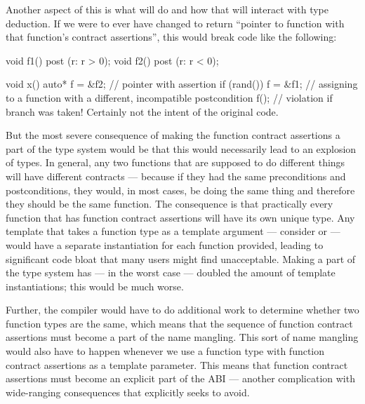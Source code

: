 Another aspect of this is what  will do and how that will interact with type deduction. If we were to ever have  changed to return ``pointer to function with that function's contract assertions'', this would break code like the following:
\begin{codeblock}
void f1() post (r: r > 0);
void f2() post (r: r < 0);

void x() {
  auto* f = &f2;   // pointer with assertion 
  if (rand()) {
    f = &f1;  // assigning to a function with a different, incompatible postcondition
  }
  f();  // violation if branch was taken! Certainly not the intent of the original code.
}
\end{codeblock}
But the most severe consequence of making the function contract assertions a part of the type system would be that this would necessarily lead to an explosion of types. In general, any two functions that are supposed to do different things will have different contracts --- because if they had the same preconditions and postconditions, they would, in most cases, be doing the same thing and therefore they should be the same function. The consequence is that practically every function that has function contract assertions will have its own unique type. Any template that takes a function type as a template argument --- consider  or  --- would have a separate instantiation for each function provided, leading to significant code bloat that many users might find unacceptable. Making  a part of the type system has --- in the worst case --- doubled the amount of template instantiations; this would be much worse.

Further, the compiler would have to do additional work to determine whether two function types are the same, which means that the sequence of function contract assertions must become a part of the name mangling. This sort of name mangling would also have to happen whenever we use a function type with function contract assertions as a template parameter. This means that function contract assertions must become an explicit part of the ABI --- another complication with wide-ranging consequences that \cite{P2900R7} explicitly seeks to avoid.

